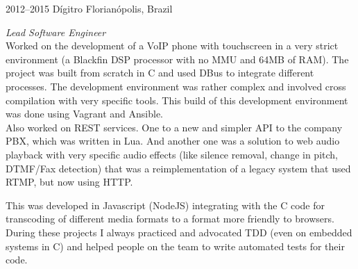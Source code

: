 \documentclass[]{friggeri-cv} %
\begin{document}
\begin{entrylist}
\entry
{2012--2015}
{Dígitro}
{Florianópolis, Brazil}
{\emph{Lead Software Engineer} \\

Worked on the development of a VoIP phone with touchscreen
in a very strict environment
(a Blackfin DSP processor with no MMU and 64MB of RAM).
The project was built from scratch in C and used
DBus to integrate different processes. The development environment
was rather complex and involved cross compilation with
very specific tools. This build of this development environment
was done using Vagrant and Ansible. \\

Also worked on REST services. One to a new and simpler API to
the company PBX, which was written in Lua. And another one
was a solution to web audio playback with very specific audio effects
(like silence removal, change in pitch, DTMF/Fax detection)
that was a reimplementation
of a legacy system that used RTMP, but now using HTTP.

This was developed in Javascript (NodeJS) integrating with the
C code for transcoding of different media formats to a format
more friendly to browsers.\\

During these projects I always practiced and advocated TDD
(even on embedded systems in C) and helped people on
the team to write automated tests for their code.
}
\end{entrylist}
\end{document}
